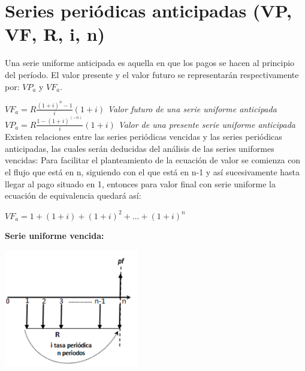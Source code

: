 	\section{Series periódicas anticipadas (VP, VF, R, i, n)}

	Una serie uniforme anticipada es aquella en que los pagos se hacen al principio del período. El valor presente y el valor futuro se representarán respectivamente por: $VP_{a}$ y $VF_{a}$.


$VF_{a}=R \frac{(1+i)^{n}-1}{i}(1+i) $ \hspace{35pt}\textit{ Valor  futuro de una serie  uniforme  anticipada}
	\\
$VP_{a}=R \frac{1-(1+i)^{(-n)}}{i}(1+i)$
	\hspace{30pt}\textit{Valor de una presente  serie  uniforme  anticipada}\\


	Existen relaciones entre las series periódicas vencidas y las series periódicas anticipadas, las cuales serán deducidas del análisis de las series uniformes vencidas: Para facilitar el planteamiento de la ecuación de valor se comienza con el flujo que está en n, siguiendo con el que está en n-1 y así sucesivamente hasta llegar al pago situado en 1, entonces para valor final con serie uniforme la ecuación de equivalencia quedará así:

	\vspace{5mm}

$VF_{a}=1+ (1+i) +(1+i)^{2}+...+(1+i)^{n} $ \\

	\vspace{5mm}

	\textbf{Serie uniforme vencida:}
	\begin{center}

		\includegraphics[height=5.1cm]{4_Capitulo/img/ejemplos/4_14.pdf}

	\end{center}


